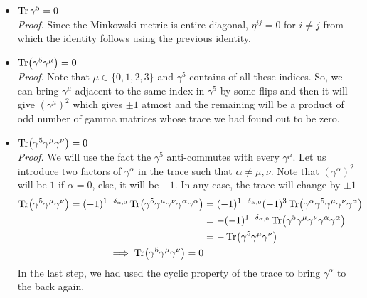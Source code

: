 \begin{itemize}
    \begin{align*}
     \Tr({{\gamma^\kappa} {\gamma^\lambda}  \gamma^\mu  \gamma^\nu}) =  \frac{1}{2} \Tr \{\gamma^\kappa, \gamma^\lambda\gamma^\mu\gamma^\nu\}&=\Tr \qty(\eta^{\kappa\lambda}\gamma^\mu\gamma^\nu - \eta^{\kappa\mu}\gamma^\lambda\gamma^\nu +\eta^{\kappa\nu}\gamma^\lambda\gamma^\mu)\\
&=\eta^{\kappa\lambda}\Tr \gamma^\mu\gamma^\nu -\eta^{\kappa\mu} \Tr \gamma^\lambda\gamma^\nu +\eta^{\kappa\nu}\Tr \gamma^\lambda\gamma^\mu\\
&= 4 \eta^{\kappa\lambda}\eta^{\mu\nu}  -4\eta^{\kappa\mu}\eta^{\lambda\nu} + 4\eta^{\kappa\nu}\eta^{\lambda\mu}
    \end{align*} 
\item $\Tr \gamma^5 =0$\\[0.25cm]
\textit{Proof.} Since the Minkowski metric is entire diagonal, $\eta^{ij}=0$ for $i\neq j$ from which the identity follows using the previous identity. 
\item $\Tr(\gamma^5 \gamma^\mu) =0$\\[0.25cm]
\textit{Proof.} Note that $\mu\in \{0,1,2,3\}$ and $\gamma^5$ contains of all these indices. So, we can bring $\gamma^\mu$ adjacent to the same index in $\gamma^5$ by some flips and then it will give $(\gamma^\mu)^2$ which gives $\pm 1$ atmost and the remaining will be a product of odd number of gamma matrices whose trace we had found out to be zero. 
\item $\Tr(\gamma^5 \gamma^\mu \gamma^\nu) =0$\\[0.25cm] 
\textit{Proof.} We will use the fact the $\gamma^5$ anti-commutes with every $\gamma^\mu$. Let us introduce two factors of $\gamma^\alpha$ in the trace such that $\alpha\neq \mu,\nu$. Note that $(\gamma^\alpha)^2$ will be $1$ if $\alpha=0$, else, it will be $-1$. In any case, the trace will change by $\pm 1$ 
\begin{align*}
    \Tr(\gamma^5 \gamma^\mu \gamma^\nu) = (-1)^{1-\delta_{\alpha, 0}}\Tr(\gamma^5 \gamma^\mu \gamma^\nu\gamma^\alpha \gamma^\alpha) &=(-1)^{1-\delta_{\alpha, 0}} (-1)^3\Tr(\gamma^\alpha \gamma^5  \gamma^\mu \gamma^\nu \gamma^\alpha) \\ &= -(-1)^{1-\delta_{\alpha, 0}} \Tr( \gamma^5  \gamma^\mu \gamma^\nu \gamma^\alpha\gamma^\alpha) \\ &= -\Tr(\gamma^5 \gamma^\mu \gamma^\nu)\\ \implies \Tr(\gamma^5 \gamma^\mu \gamma^\nu)=0
\end{align*}
In the last step, we had used the cyclic property of the trace to bring $\gamma^\alpha$ to the back again. 

\end{itemize}
